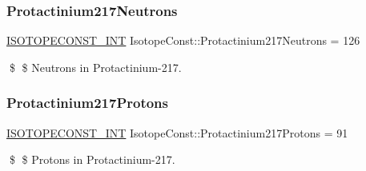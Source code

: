 \subsubsection{\texorpdfstring{Protactinium217\+Neutrons}{Protactinium217Neutrons}}
{\footnotesize\ttfamily \mbox{\hyperlink{group___isotope_const-_macros_ga5f18360b3e99483a35c32d789e62621c}{I\+S\+O\+T\+O\+P\+E\+C\+O\+N\+S\+T\+\_\+\+I\+NT}} Isotope\+Const\+::\+Protactinium217\+Neutrons = 126}

\$ \$ Neutrons in Protactinium-\/217. \mbox{\label{group___isotope_const-_protactinium-_pa217_ga4803d18323fce9068d87a7814c160064}} 
\subsubsection{\texorpdfstring{Protactinium217\+Protons}{Protactinium217Protons}}
{\footnotesize\ttfamily \mbox{\hyperlink{group___isotope_const-_macros_ga5f18360b3e99483a35c32d789e62621c}{I\+S\+O\+T\+O\+P\+E\+C\+O\+N\+S\+T\+\_\+\+I\+NT}} Isotope\+Const\+::\+Protactinium217\+Protons = 91}

\$ \$ Protons in Protactinium-\/217. 